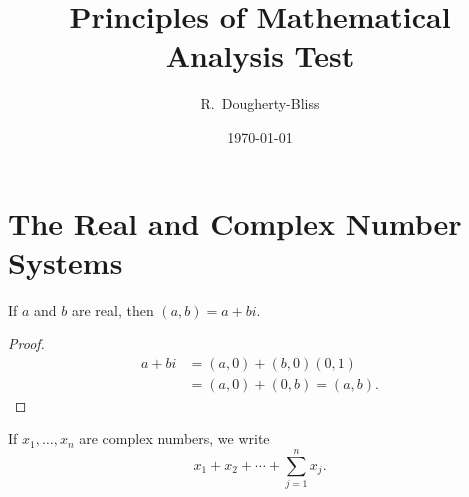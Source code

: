 \documentclass{rudin}
\title{Principles of Mathematical Analysis Test}
\author{R.~Dougherty-Bliss}
\date{\today}
\begin{document}
\maketitle

\section{The Real and Complex Number Systems}
\label{sec:the_real_and_complex_number_systems}

\begin{thm}
    If $a$ and $b$ are real, then $(a, b) = a + bi$.
\end{thm}

\begin{proof}
    \begin{align*}
        a + bi &= (a, 0) + (b, 0) (0, 1) \\
               &= (a, 0) + (0, b) = (a, b).
    \end{align*}
\end{proof}

\begin{notate}
    If $x_1, \dots, x_n$ are complex numbers, we write
    \[
        x_1 + x_2 + \cdots + \sum_{j = 1}^n x_j.
    \]
\end{notate}
\end{document}
